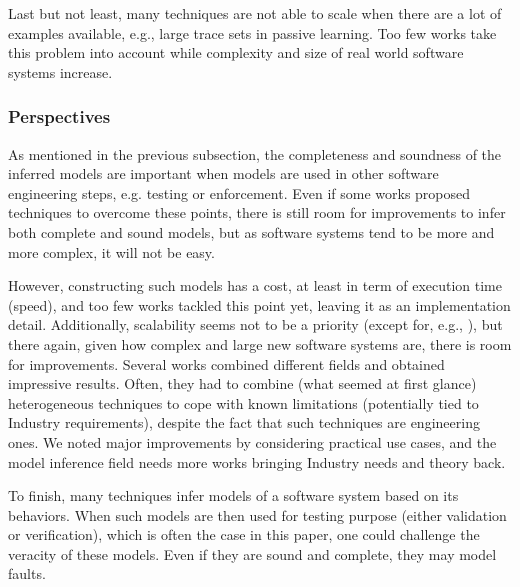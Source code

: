 Last but not least, many techniques are not able to scale when
there are a lot of examples available, e.g., large trace sets in
passive learning. Too few works take this problem into account
while complexity and size of real world software systems
increase.


\subsubsection{Perspectives}
\label{sec:discussion:perspectives}

As mentioned in the previous subsection, the completeness and
soundness of the inferred models are important when models are
used in other software engineering steps, e.g. testing or
enforcement. Even if some works
\cite{DBLP:conf/soict/DurandS14,DBLP:conf/fm/DurandS15,DBLP:conf/debs/SalvaD15,tonella2012finding}
proposed techniques to overcome these points, there is still room
for improvements to infer both complete and sound models, but as
software systems tend to be more and more complex, it will not be
easy.

However, constructing such models has a cost, at least in term of
execution time (speed), and too few works tackled this point yet,
leaving it as an implementation detail. Additionally, scalability
seems not to be a priority (except for, e.g.,
\cite{Yang:2006:PMT:1134285.1134325,Pradel:2009,DBLP:conf/debs/SalvaD15}),
but there again, given how complex and large new software systems
are, there is room for improvements. Several works combined
different fields and obtained impressive results. Often, they had
to combine (what seemed at first glance) heterogeneous techniques
to cope with known limitations (potentially tied to Industry
requirements), despite the fact that such techniques are
engineering ones. We noted major improvements by considering
practical use cases, and the model inference field needs more
works bringing Industry needs and theory back.

To finish, many techniques infer models of a software system
based on its behaviors. When such models are then used for
testing purpose (either validation or verification), which is
often the case in this paper, one could challenge the veracity of
these models. Even if they are sound and complete, they may model
faults.
